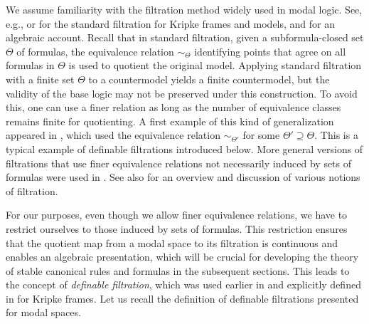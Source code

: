 \documentclass[a4paper,11pt]{article}
\theoremstyle{definition}
\theoremstyle{remark}
\numberwithin{theorem}{section}
\begin{document}
We assume familiarity with the filtration method widely used in modal logic. See, e.g., \cite[Definition 2.36]{blackburnModalLogic2001} or \cite[Section 5.3]{czModalLogic1997} for the standard filtration for Kripke frames and models, and \cite[Section 4]{stablecanonicalrules} for an algebraic account. Recall that in standard filtration, given a subformula-closed set $\Theta$ of formulas, the equivalence relation $\sim_\Theta$ identifying points that agree on all formulas in $\Theta$ is used to quotient the original model. Applying standard filtration with a finite set $\Theta$ to a countermodel yields a finite countermodel, but the validity of the base logic may not be preserved under this construction. To avoid this, one can use a finer relation as long as the number of equivalence classes remains finite for quotienting. A first example of this kind of generalization appeared in \cite{ageneralfiltrationmethod1972}, which used the equivalence relation $\sim_{\Theta'}$ for some $\Theta' \supseteq \Theta$. This is a typical example of definable filtrations introduced below. More general versions of filtrations that use finer equivalence relations not necessarily induced by sets of formulas were used in \cite{Shehtman1987,Shehtman1993,GabbayShehtman1998}. See also \cite{vanbenthemModernFacesFiltration2023} for an overview and discussion of various notions of filtration.

For our purposes, even though we allow finer equivalence relations, we have to restrict ourselves to those induced by sets of formulas. This restriction ensures that the quotient map from a modal space to its filtration is continuous and enables an algebraic presentation, which will be crucial for developing the theory of stable canonical rules and formulas in the subsequent sections. This leads to the concept of \emph{definable filtration}, which was used earlier in \cite{ageneralfiltrationmethod1972} and explicitly defined in \cite{Kikot2020} for Kripke frames. Let us recall the definition of definable filtrations presented for modal spaces.
\end{document}
